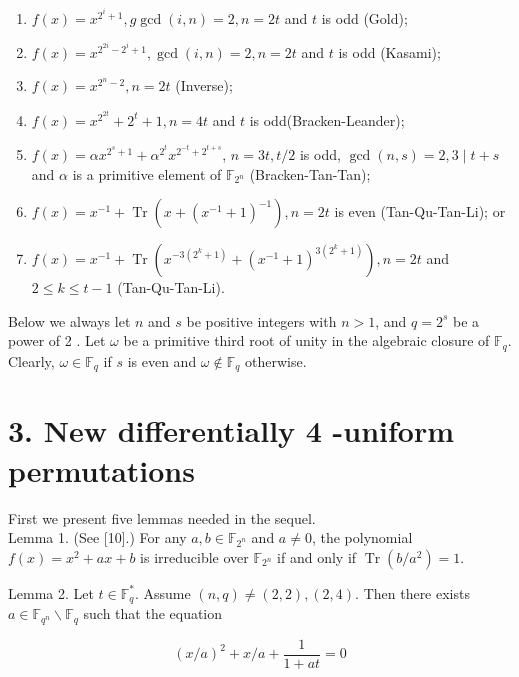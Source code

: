 \documentclass[10pt]{article}
\begin{document}
\begin{enumerate}
  \item $f(x)=x^{2^{i}+1}, g \operatorname{gcd}(i, n)=2, n=2 t$ and $t$ is odd (Gold);
  \item $f(x)=x^{2^{2 i}-2^{i}+1}, \operatorname{gcd}(i, n)=2, n=2 t$ and $t$ is odd (Kasami);
  \item $f(x)=x^{2^{n}-2}, n=2 t$ (Inverse);
  \item $f(x)=x^{2^{2 t}}+2^{t}+1, n=4 t$ and $t$ is odd(Bracken-Leander);
  \item $f(x)=\alpha x^{2^{s}+1}+\alpha^{2^{t}} x^{2^{-t}+2^{t+s}}$, $n=3 t, t / 2$ is odd, $\operatorname{gcd}(n, s)=2,3 \mid t+s$ and $\alpha$ is a primitive element of $\mathbb{F}_{2^{n}}$ (Bracken-Tan-Tan);
  \item $f(x)=x^{-1}+\operatorname{Tr}\left(x+\left(x^{-1}+1\right)^{-1}\right), n=2 t$ is even (Tan-Qu-Tan-Li); or
  \item $f(x)=x^{-1}+\operatorname{Tr}\left(x^{-3\left(2^{k}+1\right)}+\left(x^{-1}+1\right)^{3\left(2^{k}+1\right)}\right), n=2 t$ and $2 \leqslant k \leqslant t-1$ (Tan-Qu-Tan-Li).
\end{enumerate}

Below we always let $n$ and $s$ be positive integers with $n>1$, and $q=2^{s}$ be a power of 2 . Let $\omega$ be a primitive third root of unity in the algebraic closure of $\mathbb{F}_{q}$. Clearly, $\omega \in \mathbb{F}_{q}$ if $s$ is even and $\omega \notin \mathbb{F}_{q}$ otherwise.

\section*{3. New differentially 4 -uniform permutations}
First we present five lemmas needed in the sequel.\\[0pt]
Lemma 1. (See [10].) For any $a, b \in \mathbb{F}_{2^{n}}$ and $a \neq 0$, the polynomial $f(x)=x^{2}+a x+b$ is irreducible over $\mathbb{F}_{2^{n}}$ if and only if $\operatorname{Tr}\left(b / a^{2}\right)=1$.

Lemma 2. Let $t \in \mathbb{F}_{q}^{*}$. Assume $(n, q) \neq(2,2),(2,4)$. Then there exists $a \in \mathbb{F}_{q^{n}} \backslash \mathbb{F}_{q}$ such that the equation


\begin{equation*}
(x / a)^{2}+x / a+\frac{1}{1+a t}=0 \tag{1}
\end{equation*}
\end{document}
